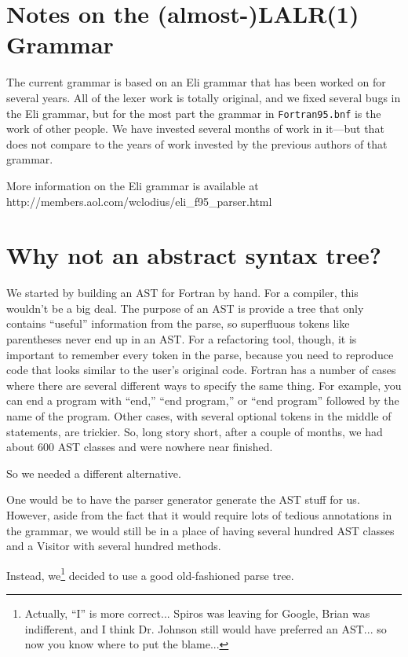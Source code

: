 
\section{Notes on the (almost-)LALR(1) Grammar}

The current grammar is based on an Eli grammar that has been worked on
for several years.  All of the lexer work is totally original, and we fixed
several bugs in the Eli grammar, but for the most part the grammar in
\texttt{Fortran95.bnf} is the work of other people.  We have invested
several months of work in it---but that does not compare to the years of
work invested by the previous authors of that grammar.

More information on the Eli grammar is available at
http://members.aol.com/wclodius/eli\_f95\_parser.html

\section{Why not an abstract syntax tree?}

We started by building an AST for Fortran by hand.  For a compiler, this
wouldn't be a big deal.  The purpose of an AST is provide a tree that only
contains ``useful'' information from the parse, so superfluous tokens like
parentheses never end up in an AST.  For a refactoring tool, though,
it is important to remember every token in the parse, because you need to
reproduce code that looks similar to the user's original code.  Fortran
has a number of cases where there are several different ways to specify the
same thing.  For example, you can end a program with ``end,'' ``end program,''
or ``end program'' followed by the name of the program.  Other cases, with
several optional tokens in the middle of statements, are trickier.  So,
long story short, after a couple of months, we had about 600 AST classes and
were nowhere near finished.

So we needed a different alternative.

One would be to have the parser generator generate the AST stuff for us.
However, aside from the fact that it would require lots of tedious annotations
in the grammar, we would still be in a place of having several hundred AST
classes and a Visitor with several hundred methods.

Instead, we\footnote{Actually, ``I'' is more correct... Spiros was leaving
for Google, Brian was indifferent, and I think Dr. Johnson still would
have preferred an AST... so now you know where to put the blame...} decided
to use a good old-fashioned parse tree.

